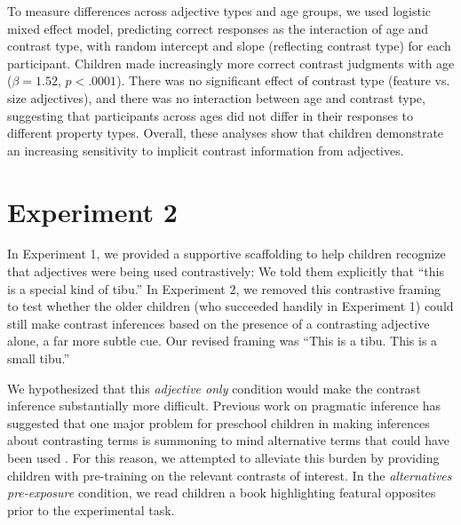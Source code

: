 \documentclass[man]{apa2}
\begin{document}
To measure differences across adjective types and age groups, we used logistic mixed effect model, predicting correct responses as the interaction of age and contrast type, with random intercept and slope (reflecting contrast type) for each participant.  Children made increasingly more correct contrast judgments with age ($\beta = 1.52$, $p < .0001$). There was no significant effect of contrast type (feature vs. size adjectives), and there was no interaction between age and contrast type, suggesting that participants across ages did not differ in their responses to different property types.  Overall, these analyses show that children demonstrate an increasing sensitivity to implicit contrast information from adjectives.  





\section{Experiment 2}


In Experiment 1, we provided a supportive scaffolding to help children recognize that adjectives were being used contrastively: We told them explicitly that ``this is a special kind of tibu.''  In Experiment 2, we removed this contrastive framing to test whether the older children (who succeeded handily in Experiment 1) could still make contrast inferences based on the presence of a contrasting adjective alone, a far more subtle cue. Our revised framing was ``This is a tibu. This is a small tibu.'' 

We hypothesized that this \emph{adjective only} condition would make the contrast inference substantially more difficult. Previous work on pragmatic inference has suggested that one major problem for preschool children in making inferences about contrasting terms is summoning to mind alternative terms that could have been used \cite{barner2011}. For this reason, we attempted to alleviate this burden by providing children with pre-training on the relevant contrasts of interest. In the \emph{alternatives pre-exposure} condition, we read children a book highlighting featural opposites prior to the experimental task.
\end{document}
